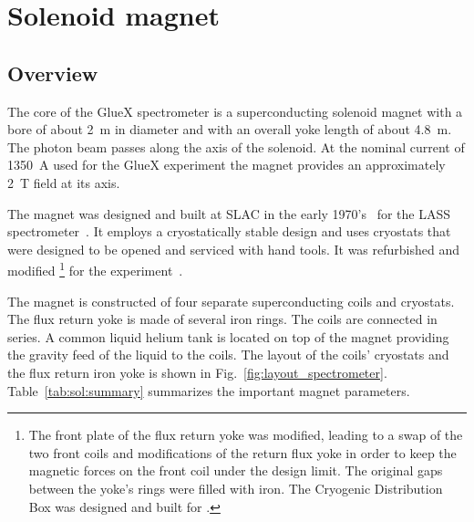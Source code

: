 
\section[Solenoid Magnet]{Solenoid magnet 
  \label{sec:solenoid}
}

\subsection[Overview]{Overview \label{sec:sol:overview}
}

The core of the GlueX spectrometer is a superconducting
solenoid magnet with a bore of about 2~m in diameter and with an overall 
yoke length of about 4.8~m. The photon beam passes along the axis of
the solenoid.  At the nominal current of 1350~A used for the GlueX
experiment the magnet provides an approximately 2~T field at its axis.

The magnet was designed and built at SLAC in the early
1970's~\cite{Alcorn-confer-1972} for the LASS
spectrometer~\cite{Aston:1987uc}. It employs a cryostatically
stable design and uses cryostats that were designed to be opened and
serviced with hand tools. It was refurbished and modified%
\footnote{
  The front plate of the flux return yoke was modified, leading to a
  swap of the two front coils and modifications of the return flux
  yoke in order to keep the magnetic forces on the front coil under
  the design limit.  The original gaps between the yoke's rings were
  filled with iron. The Cryogenic Distribution Box was designed and
  built for \gx{}.
} 
for the \gx{} experiment~\cite{Ballard:2011tm, Ballard:2015wma}. 

The magnet is constructed of four separate superconducting coils and
cryostats. The flux return yoke is made of several iron rings.  The
coils are connected in series. A common liquid helium tank is located
on top of the magnet providing the gravity feed of the liquid to the
coils. The layout of the coils' cryostats and the flux return iron
yoke is shown in Fig.~\ref{fig:layout_spectrometer}.
Table~\ref{tab:sol:summary} summarizes the important magnet
parameters.

  

